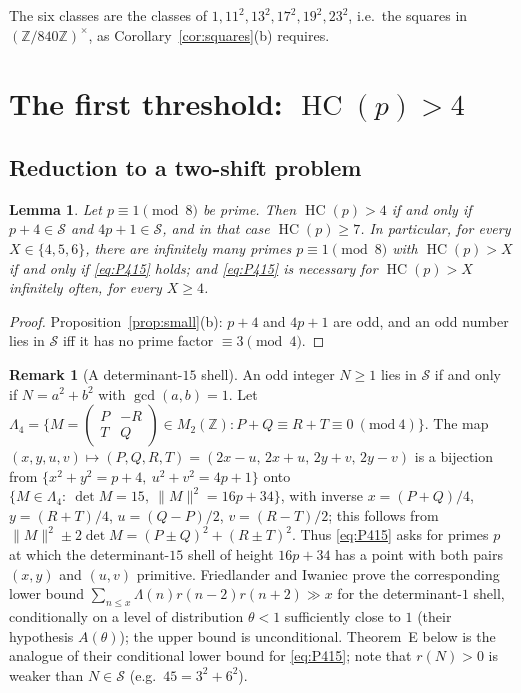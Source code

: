 \documentclass[11pt,reqno]{amsart}
\newtheorem{lemma}[theorem]{Lemma}
\theoremstyle{definition}
\newtheorem{remark}[theorem]{Remark}
\newcommand{\Z}{\mathbb Z}
\newcommand{\cS}{\mathcal S}
\newcommand{\HC}{\operatorname{HC}}
\begin{document}
The six classes are the classes of $1,11^2,13^2,17^2,19^2,23^2$, i.e.\
the squares in $(\Z/840\Z)^\times$, as Corollary~\ref{cor:squares}(b)
requires.

\section{The first threshold: \texorpdfstring{$\HC(p)>4$}{HC(p)>4}}\label{sec:kill}

\subsection{Reduction to a two-shift problem}

\begin{lemma}\label{lem:K4}
Let $p\equiv1\pmod8$ be prime.  Then $\HC(p)>4$ if and only if
$p+4\in\cS$ and $4p+1\in\cS$, and in that case $\HC(p)\ge7$.  In
particular, for every $X\in\{4,5,6\}$, there are infinitely many primes
$p\equiv1\pmod 8$ with $\HC(p)>X$ if and only if \eqref{eq:P415} holds;
and \eqref{eq:P415} is necessary for $\HC(p)>X$ infinitely often, for every
$X\ge4$.
\end{lemma}

\begin{proof}
Proposition~\ref{prop:small}(b): $p+4$ and $4p+1$ are odd, and an odd
number lies in $\cS$ iff it has no prime factor $\equiv3\pmod4$.
\end{proof}

\begin{remark}[A determinant-$15$ shell]\label{rem:shell}
An odd integer $N\ge1$ lies in $\cS$ if and only if $N=a^2+b^2$ with
$\gcd(a,b)=1$.  Let
$\Lambda_4=\{M=\left(\begin{smallmatrix}P&-R\\T&Q\end{smallmatrix}\right)\in M_2(\Z):
P+Q\equiv R+T\equiv0\ (\mathrm{mod}\ 4)\}$.  The map
$(x,y,u,v)\mapsto(P,Q,R,T)=(2x-u,\,2x+u,\,2y+v,\,2y-v)$ is a bijection
from $\{x^2+y^2=p+4,\ u^2+v^2=4p+1\}$ onto
$\{M\in\Lambda_4:\ \det M=15,\ \|M\|^2=16p+34\}$, with inverse
$x=(P+Q)/4$, $y=(R+T)/4$, $u=(Q-P)/2$, $v=(R-T)/2$; this follows from
$\|M\|^2\pm2\det M=(P\pm Q)^2+(R\pm T)^2$.  Thus \eqref{eq:P415} asks for
primes $p$ at which the determinant-$15$ shell of height $16p+34$ has a
point with both pairs $(x,y)$ and $(u,v)$ primitive.  Friedlander and
Iwaniec \cite[Thms.~3--4]{FI09} prove the corresponding lower bound
$\sum_{n\le x}\Lambda(n)r(n-2)r(n+2)\gg x$ for the determinant-$1$
shell, conditionally on a level of distribution $\theta<1$ sufficiently
close to $1$ (their hypothesis $A(\theta)$); the upper bound is
unconditional.  Theorem~E below is the analogue of their conditional
lower bound for \eqref{eq:P415}; note that $r(N)>0$ is weaker than
$N\in\cS$ (e.g.\ $45=3^2+6^2$).
\end{remark}
\end{document}
